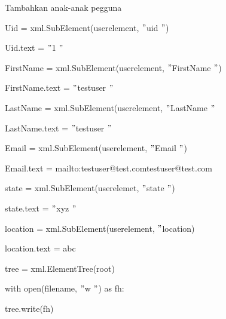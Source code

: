 \vspace{10pt}
\vspace{10pt}
\vspace{10pt}
\noindent 
Tambahkan anak-anak pegguna \par
\vspace{10pt}
\noindent 
{\fontsize{10pt}{10pt}\selectfont Uid = xml.SubElement(userelement,  $ " $uid $ " $)} \par
\noindent 
{\fontsize{10pt}{10pt}\selectfont Uid.text =  $ " $1 $ " $} \par
\vspace{10pt}
\noindent 
{\fontsize{10pt}{10pt}\selectfont FirstName = xml.SubElement(userelement,  $ " $FirstName $ " $)} \par
\noindent 
{\fontsize{10pt}{10pt}\selectfont FirstName.text =  $ " $testuser $ " $} \par
\vspace{10pt}
\noindent 
{\fontsize{10pt}{10pt}\selectfont LastName = xml.SubElement(userelement,  $ " $LastName $ " $} \par
\noindent 
{\fontsize{10pt}{10pt}\selectfont LastName.text =  $ " $testuser $ " $} \par
\vspace{10pt}
\noindent 
{\fontsize{10pt}{10pt}\selectfont Email = xml.SubElement(userelement,  $ " $Email $ " $)} \par
\noindent 
{\fontsize{10pt}{10pt}\selectfont Email.text = {mailto:testuser@test.com}{testuser@test.com}
} \par
\vspace{10pt}
\noindent 
{\fontsize{10pt}{10pt}\selectfont state = xml.SubElement(userelemet,  $ " $state $ " $)} \par
\noindent 
{\fontsize{10pt}{10pt}\selectfont state.text =  $ " $xyz $ " $} \par
\vspace{10pt}
\noindent 
{\fontsize{10pt}{10pt}\selectfont location = xml.SubElement(userelement,  $ " $location)} \par
\noindent 
{\fontsize{10pt}{10pt}\selectfont location.text = abc} \par
\vspace{10pt}
\noindent 
{\fontsize{10pt}{10pt}\selectfont tree = xml.ElementTree(root)} \par
\noindent 
{\fontsize{10pt}{10pt}\selectfont with open(filename,  $ " $w $ " $) as fh:} \par
\noindent 
{\fontsize{10pt}{10pt}\selectfont tree.write(fh)} \par
